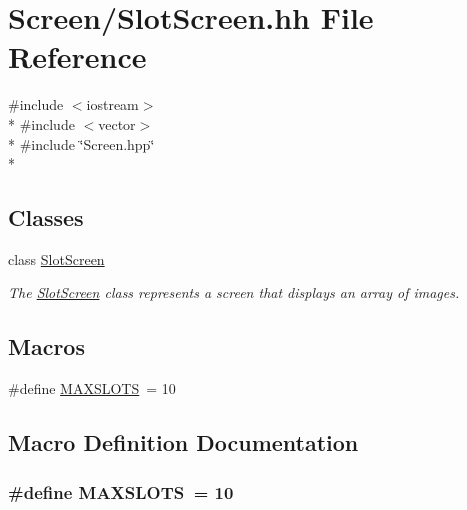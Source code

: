 \hypertarget{SlotScreen_8hh}{\section{Screen/\-Slot\-Screen.hh File Reference}
\label{SlotScreen_8hh}
}
{\ttfamily \#include $<$iostream$>$}\\*
{\ttfamily \#include $<$vector$>$}\\*
{\ttfamily \#include \char`\"{}Screen.\-hpp\char`\"{}}\\*
\subsection*{Classes}
\begin{DoxyCompactItemize}
\item 
class \hyperlink{classSlotScreen}{Slot\-Screen}
\begin{DoxyCompactList}\small\item\em The \hyperlink{classSlotScreen}{Slot\-Screen} class represents a screen that displays an array of images. \end{DoxyCompactList}\end{DoxyCompactItemize}
\subsection*{Macros}
\begin{DoxyCompactItemize}
\item 
\#define \hyperlink{SlotScreen_8hh_af4470e8e16995f88a0c45ad0f4a6f183}{M\-A\-X\-S\-L\-O\-T\-S}~= 10
\end{DoxyCompactItemize}


\subsection{Macro Definition Documentation}
\hypertarget{SlotScreen_8hh_af4470e8e16995f88a0c45ad0f4a6f183}{
\subsubsection[{M\-A\-X\-S\-L\-O\-T\-S}]{\setlength{\rightskip}{0pt plus 5cm}\#define M\-A\-X\-S\-L\-O\-T\-S~= 10}}\label{SlotScreen_8hh_af4470e8e16995f88a0c45ad0f4a6f183}
